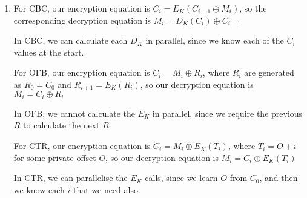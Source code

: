 \begin{enumerate}[label=(\alph*)]
\begin{itemize}
  \end{itemize}

\item
  For CBC, our encryption equation is $C_i = E_K(C_{i-1} \oplus M_i)$, so the corresponding decryption equation is $M_i = D_K(C_i) \oplus C_{i-1}$

  In CBC, we can calculate each $D_K$ in parallel, since we know each of the $C_i$ values at the start.

  For OFB, our encryption equation is $C_i = M_i \oplus R_i$, where $R_i$ are generated as $R_0 = C_0$ and $R_{i+1} = E_K(R_{i})$, so our decryption equation is $M_i = C_i \oplus R_i$

  In OFB, we cannot calculate the $E_K$ in parallel, since we require the previous $R$ to calculate the next $R$.

  For CTR, our encryption equation is $C_i = M_i \oplus E_K(T_i)$, where $T_i = O+i$ for some private offset $O$, so our decryption equation is $M_i = C_i \oplus E_K(T_i)$

  In CTR, we can parallelise the $E_K$ calls, since we learn $O$ from $C_0$, and then we know each $i$ that we need also.





        
\end{enumerate}

